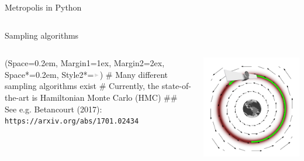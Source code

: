 \documentclass[12pt, aspectratio=149]{beamer}
\newcommand{\listSpace}{0.2em}
\theoremstyle{plain}
\begin{document}
\begin{frame}[fragile]{Metropolis in Python}
	\inputminted[fontsize=\tiny]{python}{../code/metropolis.py}
\end{frame}

\begin{frame}[fragile]{Sampling algorithms}
	\begin{columns}
		\begin{column}{0.5\linewidth}
			\begin{easylist}[itemize]
				\ListProperties(Space=\listSpace, Margin1=1ex, Margin2=2ex, Space*=\listSpace, Style2*=$\color{bggraydark}\blacktriangleright$\space)
				# Many different sampling algorithms exist
				# Currently, the state-of-the-art is Hamiltonian Monte Carlo (HMC)
				## See e.g. Betancourt (2017): \footnotesize\texttt{https://arxiv.org/abs/1701.02434}
			\end{easylist}
		\end{column}
		\begin{column}{0.5\textwidth}
			\includegraphics[width=\textwidth]{figs/hmc.png}
		\end{column}
	\end{columns}
\end{frame}
\end{document}
